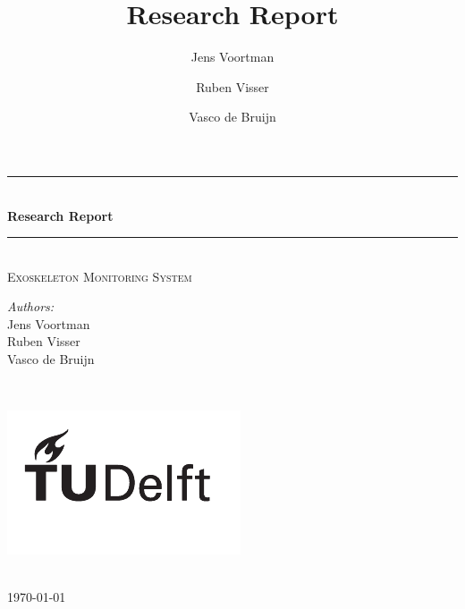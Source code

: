\documentclass [a4paper,11pt]{article}
\title{Research Report}
\author{Jens Voortman \and Ruben Visser \and Vasco de Bruijn}
\begin{document}
\begin{titlepage}

\newcommand{\HRule}{\rule{\linewidth}{0.5mm}}
\centering

\HRule \\[0.4cm]
{ \huge \bfseries Research Report}\\ %
\HRule \\[0.5cm]

\textsc{\large Exoskeleton Monitoring System}\\[14.5cm]

\begin{minipage}{0.4\textwidth}
\begin{flushleft} \large
\emph{Authors:}\\
Jens Voortman\\
Ruben Visser\\
Vasco de Bruijn
\end{flushleft}
\end{minipage}
~
\begin{minipage}{0.4\textwidth}
\begin{flushright} \large
\includegraphics{logo_black}
\end{flushright}
\end{minipage}\\[2cm]

{\large \today}\\

\vfill
\end{titlepage}

\pagebreak
\tableofcontents
\pagebreak



\pagebreak

\pagebreak

\pagebreak

\pagebreak

\pagebreak

\pagebreak

\pagebreak

\pagebreak

\pagebreak

\appendix

\end{document}
